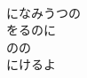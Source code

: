 \documentclass[10pt,b5j]{tarticle} %
\begin{document}
\begin{enumerate}
\begin{minipage}[c]{\blocksize}
        \vspace{\linespace}
        \item~\\
        になみうつの\\
        をるのに\\
        のの\\
        にけるよ
    
    \end{minipage}
\end{enumerate} %
\end{document}
